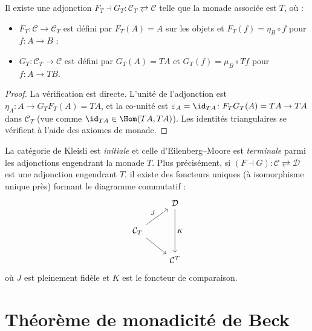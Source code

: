 \begin{theoreme}\label{thm:adjonction-kleisli}
Il existe une adjonction $F_T \dashv G_T \colon \mathcal{C}_T
\rightleftarrows \mathcal{C}$ telle que la monade associée est $T$, où :
\begin{itemize}
    \item $F_T \colon \mathcal{C} \to \mathcal{C}_T$ est défini par
    $F_T(A) = A$ sur les objets et $F_T(f) = \eta_B \circ f$ pour
    $f \colon A \to B$ ;
    \item $G_T \colon \mathcal{C}_T \to \mathcal{C}$ est défini par
    $G_T(A) = TA$ et $G_T(f) = \mu_B \circ Tf$ pour $f \colon A \to TB$.
\end{itemize}
\end{theoreme}

\begin{proof}
La vérification est directe. L'unité de l'adjonction est
$\eta_A \colon A \to G_T F_T(A) = TA$, et la co-unité est
$\varepsilon_A = \id_{TA} \colon F_T G_T(A) = TA \to TA$ dans
$\mathcal{C}_T$ (vue comme $\id_{TA} \in \Hom(TA, TA)$).
Les identités triangulaires se vérifient à l'aide des axiomes de monade.
\end{proof}

\begin{remarque}\label{rem:kleisli-EM-universalite}
La catégorie de Kleisli est \emph{initiale} et celle d'Eilenberg--Moore
est \emph{terminale} parmi les adjonctions engendrant la monade $T$.
Plus précisément, si $(F \dashv G) \colon \mathcal{C} \rightleftarrows
\mathcal{D}$ est une adjonction engendrant $T$, il existe des foncteurs
uniques (à isomorphisme unique près) formant le diagramme commutatif :
\[
\begin{tikzcd}
& \mathcal{D} \arrow[dd, "K"] \\
\mathcal{C}_T \arrow[ur, "J"] \arrow[dr] & \\
& \mathcal{C}^T
\end{tikzcd}
\]
où $J$ est pleinement fidèle et $K$ est le foncteur de comparaison.
\end{remarque}


\section{Théorème de monadicité de Beck}\label{sec:beck}

